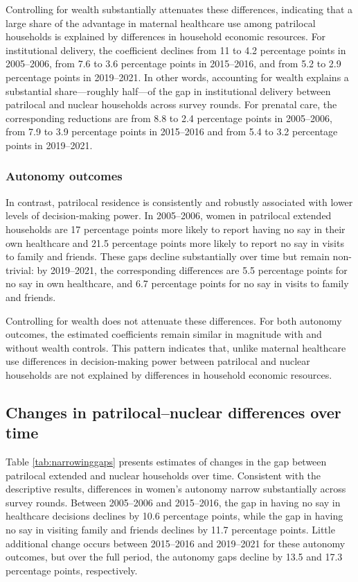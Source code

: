 \documentclass[12pt]{article}
\begin{document}
Controlling for wealth substantially attenuates these differences, indicating that a large share of the advantage in maternal healthcare use among patrilocal households is explained by differences in household economic resources. For institutional delivery, the coefficient declines from 11 to 4.2 percentage points in 2005–2006, from 7.6 to 3.6 percentage points in 2015–2016, and from 5.2 to 2.9 percentage points in 2019–2021. In other words, accounting for wealth explains a substantial share—roughly half—of the gap in institutional delivery between patrilocal and nuclear households across survey rounds. For prenatal care, the corresponding reductions are from 8.8 to 2.4 percentage points in 2005–2006, from 7.9 to 3.9 percentage points in 2015–2016 and from 5.4 to 3.2 percentage points in 2019–2021.

\subsubsection{Autonomy outcomes}

In contrast, patrilocal residence is consistently and robustly associated with lower levels of decision-making power. In 2005–2006, women in patrilocal extended households are 17 percentage points more likely to report having no say in their own healthcare and 21.5 percentage points more likely to report no say in visits to family and friends. These gaps decline substantially over time but remain non-trivial: by 2019–2021, the corresponding differences are 5.5 percentage points for no say in own healthcare, and 6.7 percentage points for no say in visits to family and friends. 

Controlling for wealth does not attenuate these differences. For both autonomy outcomes, the estimated coefficients remain similar in magnitude with and without wealth controls. This pattern indicates that, unlike maternal healthcare use differences in decision-making power between patrilocal and nuclear households are not explained by differences in household economic resources.

\subsection{Changes in patrilocal–nuclear differences over time}

Table \ref{tab:narrowinggaps} presents estimates of changes in the gap between patrilocal extended and nuclear households over time. Consistent with the descriptive results, differences in women’s autonomy narrow substantially across survey rounds. Between 2005–2006 and 2015–2016, the gap in having no say in healthcare decisions declines by 10.6 percentage points, while the gap in having no say in visiting family and friends declines by 11.7 percentage points. Little additional change occurs between 2015–2016 and 2019–2021 for these autonomy outcomes, but over the full period, the autonomy gaps decline by 13.5 and 17.3 percentage points, respectively.
\end{document}
